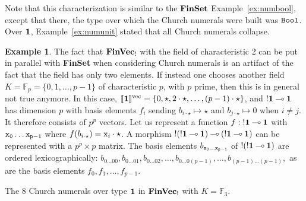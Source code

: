 \documentclass[10pt]{article}
\theoremstyle{plain}
\theoremstyle{definition}
\newtheorem{example}[theorem]{Example}
\newcommand{\loli}{\mathbin{\multimap}}
\newcommand{\FinSet}{\mbox{\bf FinSet}}
\newcommand{\FinVec}{\mbox{\bf FinVec}}
\newcommand{\tunit}{{\bf 1}}
\newcommand{\bit}{{\tt Bool}}
\newcommand{\fvdenot}[1]{{[\![{#1}]\!]^{\rm vec}}}
\begin{document}
  Note that this characterization is similar to the ${\FinSet}$ 
  Example~\ref{ex:numbool}, except that there, the type over which the
  Church numerals were built was $\bit$. Over $\tunit$,
  Example~\ref{ex:numunit} stated that all Church numerals collapse.

\begin{example}
  \label{ex:numunit-alg2}
  The fact that ${\FinVec}_!$ with the field of characteristic 2 can
  be put in parallel with {\FinSet} when considering Church numerals
  is an artifact of the fact that the field has only two elements. If
  instead one chooses another field
  $K=\mathbb{F}_p=\{0,1,\ldots,p-1\}$ of
  characteristic $p$, with $p$ prime,
  then this is in general not true anymore. In this case,
  $\fvdenot{\tunit}=\{0,\star,2\cdot\star,\ldots,(p-1)\cdot\star\}$, and ${!\tunit}\loli\tunit$
  has dimension $p$ with basis elements 
  $f_i$ sending $b_{i\cdot\star}\mapsto \star$ and $b_{j\cdot\star} \mapsto 0$ when $i\neq j$.
  It therefore consists of $p^p$ vectors. Let us represent a function
  $f:{!\tunit}\loli\tunit$ with ${\tt x_0\ldots{}x_{p-1}}$ where
  $f(b_{i\cdot\star})={\tt x}_i\cdot\star$. A morphism
  $!({!\tunit}\loli\tunit)\loli({!\tunit}\loli\tunit)$ can be
  represented with a $p^p\times p$ matrix. The basis elements $b_{\tt
    x_0\ldots{}x_{p-1}}$ of $!({!\tunit}\loli\tunit)$ are ordered
  lexicographically:
  $
  b_{0\ldots{}00}, b_{0\ldots01}, b_{0\ldots02}, \ldots, 
  b_{0\ldots0(p-1)}, \ldots, b_{(p-1)\ldots(p-1)},
  $
  as are the basis elements $f_0,f_1,\ldots,f_{p-1}$.
\begin{table*}[t]
  \caption{The $8$ Church numerals over type $\tunit$ in ${\FinVec}_!$ with $K=\mathbb{F}_3$.}
  \label{tab:sevenmat}
  \scalebox{.84}{\begin{minipage}{5.67in}
  \[
  \begin{array}{ll}
  \scalebox{.8}{$\overline{0} = {}$}\\ \left(
    \begin{smallmatrix}
      0&0&0&0&0&0&0&0&0&0&0&0&0&0&0&0&0&0&0&0&0&0&0&0&0&0&0\\
      1&1&1&1&1&1&1&1&1&1&1&1&1&1&1&1&1&1&1&1&1&1&1&1&1&1&1\\
      2&2&2&2&2&2&2&2&2&2&2&2&2&2&2&2&2&2&2&2&2&2&2&2&2&2&2
    \end{smallmatrix}
  \right)
  \end{array}
  \begin{array}{ll}
  \scalebox{.8}{$\overline{1} = {}$}\\ \left(
    \begin{smallmatrix}

\end{smallmatrix}
\end{array}\]
\end{minipage}}
\end{table*}
\end{example}
\end{document}
